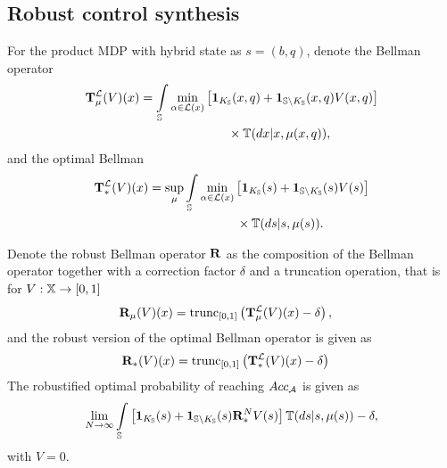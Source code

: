 \documentclass{ifacconf}
\begin{document}
\subsection{Robust control synthesis}

For the product MDP with hybrid state as $s=(b, q)$, denote the Bellman operator
\begin{align}\label{eq:V_recopt_inf}
& \Bel_\mu^\Labset (V)(x) =\int_{\S}\min_{\alpha \in \Labset(x)}\left[\mathbf 1_{K_\S}(\bar x,\bar q)+ \mathbf 1_{\S\setminus K_\S}(\bar x,\bar q) V(\bar x,\bar q)\right]\notag\\&\hspace{4cm}\hfill \times{\mathbb{T}}(d\bar x|x,\mu(x,q)),
\end{align}
and the optimal Bellman 
\begin{align}\label{eq:V_recopt_inf}
& \Bel_\ast^\Labset (V)(x) =\sup_\mu\int_{\S}\min_{\alpha \in \Labset(x)}\left[\mathbf 1_{K_\S}(\bar s)+ \mathbf 1_{\S\setminus K_\S}(\bar s) V(\bar s)\right]\notag \\&\hspace{4cm}\times\bar{\mathbb{T}} (d\bar s|s,\mu(s)).
\end{align}



Denote the robust Bellman operator ${\mathbf {R}}$ as the composition of the Bellman operator together with a correction factor $\delta$ and  a truncation operation, that is for $V:{\mathbb{X}}\rightarrow [0,1]$
\begin{align}\label{eq:V_recopt_inf}
& {\mathbf {R}}_\mu (V)(x) = \mathop{\mathrm{trunc}}\nolimits_{[0,1]}\left({\mathbf {T}}_\mu^{\mathcal{L}} (V)(x)-\delta\right),
\end{align}
and the robust version of the optimal Bellman operator is given as 
\begin{align}\label{eq:V_recopt_inf}
& {\mathbf {R}}_\ast (V)(x)= \mathop{\mathrm{trunc}}\nolimits_{[0,1]}\left({\mathbf {T}}_\ast^{\mathcal{L}} (V)(x)-\delta\right)
\end{align}
The robustified optimal probability of reaching $Acc_{\mathcal{A}}$ is given as
\begin{align}
	\lim_{N\rightarrow \infty}\int_{\S}\left[\mathbf 1_{K_\S}(\bar s)+ \mathbf 1_{\S\setminus K_\S}(\bar s) \BelR^N_\ast V(\bar s)\right]\bar{\mathbb{T}} (d\bar s|s,\mu(s))-\delta,
\end{align}
with $V=0$.


\begin{figure}[htp]
\centering
{}

\end{figure}
\end{document}
